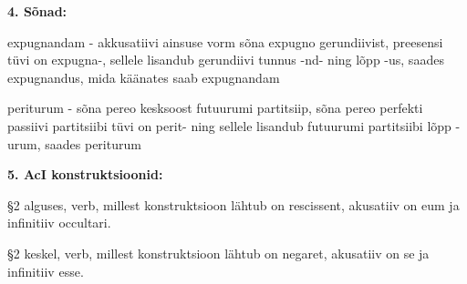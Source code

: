 \documentclass[12pt]{article}
\begin{document}
\textbf{4. Sõnad:}
\item expugnandam - akkusatiivi ainsuse vorm sõna expugno gerundiivist, preesensi tüvi on expugna-, sellele lisandub gerundiivi tunnus -nd- ning lõpp -us, saades expugnandus, mida käänates saab expugnandam
\item periturum - sõna pereo kesksoost futuurumi partitsiip, sõna pereo perfekti passiivi partitsiibi tüvi on perit- ning sellele lisandub futuurumi partitsiibi lõpp -urum, saades periturum

\textbf{5. AcI konstruktsioonid:}\\
\item \S2 alguses, verb, millest konstruktsioon lähtub on rescissent, akusatiiv on eum ja infinitiiv occultari.
\item \S2 keskel, verb, millest konstruktsioon lähtub on negaret, akusatiiv on se ja infinitiiv esse.
\end{document}
